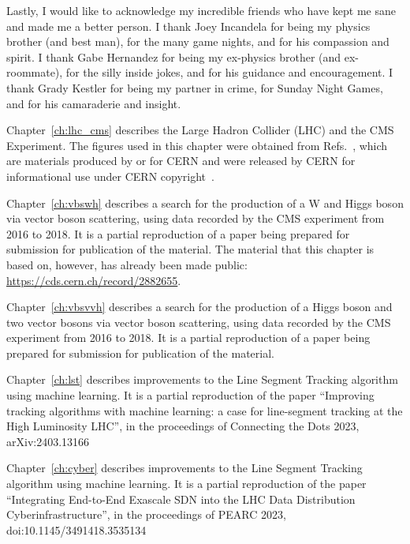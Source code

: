 \begin{acknowledgements}
Lastly, I would like to acknowledge my incredible friends who have kept me sane and made me a better person. 
I thank Joey Incandela for being my physics brother (and best man), for the many game nights, and for his compassion and spirit. 
I thank Gabe Hernandez for being my ex-physics brother (and ex-roommate), for the silly inside jokes, and for his guidance and encouragement. 
I thank Grady Kestler for being my partner in crime, for Sunday Night Games, and for his camaraderie and insight. 

Chapter~\ref{ch:lhc_cms} describes the Large Hadron Collider (LHC) and the CMS Experiment. 
The figures used in this chapter were obtained from Refs.~\cite{Servicegraphique:1708849, Maximilien:1295244, Lopienska:2800984, Dominguez:1741036, Barney:2120661, CourierSolenoid, Maximilien:995912, Hoch:1275108, Brice:1431477, Brice:1431485, GinterRussianDudes}, which are materials produced by or for CERN and were released by CERN for informational use under CERN copyright~\cite{CERNCopyright}. 

Chapter~\ref{ch:vbswh} describes a search for the production of a W and Higgs boson via vector boson scattering, using data recorded by the CMS experiment from 2016 to 2018. 
It is a partial reproduction of a paper being prepared for submission for publication of the material. 
The material that this chapter is based on, however, has already been made public: \url{https://cds.cern.ch/record/2882655}.

Chapter~\ref{ch:vbsvvh} describes a search for the production of a Higgs boson and two vector bosons via vector boson scattering, using data recorded by the CMS experiment from 2016 to 2018. 
It is a partial reproduction of a paper being prepared for submission for publication of the material. 

Chapter~\ref{ch:lst} describes improvements to the Line Segment Tracking algorithm using machine learning. 
It is a partial reproduction of the paper ``Improving tracking algorithms with machine learning: a case for line-segment tracking at the High Luminosity LHC'', in the proceedings of Connecting the Dots 2023, arXiv:2403.13166

Chapter~\ref{ch:cyber} describes improvements to the Line Segment Tracking algorithm using machine learning. 
It is a partial reproduction of the paper ``Integrating End-to-End Exascale SDN into the LHC Data Distribution Cyberinfrastructure'', in the proceedings of PEARC 2023, doi:10.1145/3491418.3535134

\end{acknowledgements}
